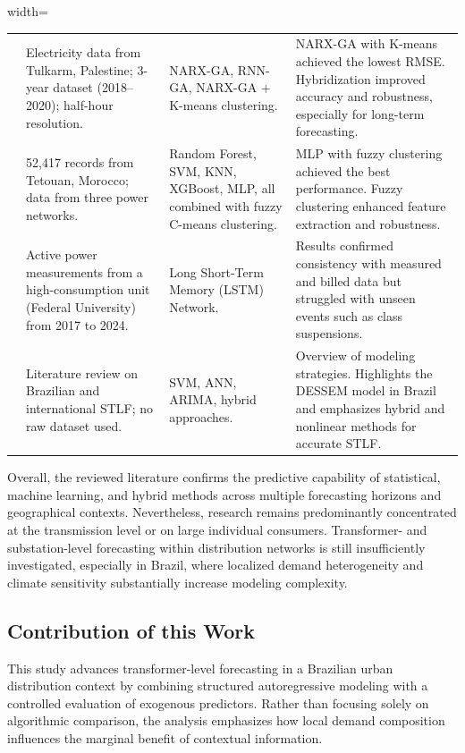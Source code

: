 \begin{table}[p]
{\begin{adjustbox}{width=\textheight}
\begin{tabular}{p{3cm} p{5cm} p{4.5cm} p{6cm}}
\cite{Hussein2024} &
Electricity data from Tulkarm, Palestine; 3-year dataset (2018--2020); half-hour resolution. &
NARX-GA, RNN-GA, NARX-GA + K-means clustering. &
NARX-GA with K-means achieved the lowest RMSE. Hybridization improved accuracy and robustness, especially for long-term forecasting. \\

\cite{Alsalem2025} &
52,417 records from Tetouan, Morocco; data from three power networks. &
Random Forest, SVM, KNN, XGBoost, MLP, all combined with fuzzy C-means clustering. &
MLP with fuzzy clustering achieved the best performance. Fuzzy clustering enhanced feature extraction and robustness. \\

\cite{DosSantos2024} &
Active power measurements from a high-consumption unit (Federal University) from 2017 to 2024. &
Long Short-Term Memory (LSTM) Network. &
Results confirmed consistency with measured and billed data but struggled with unseen events such as class suspensions. \\

\cite{Aquila2023} &
Literature review on Brazilian and international STLF; no raw dataset used. &
SVM, ANN, ARIMA, hybrid approaches. &
Overview of modeling strategies. Highlights the DESSEM model in Brazil and emphasizes hybrid and nonlinear methods for accurate STLF. \\

\bottomrule
\end{tabular}
\end{adjustbox}
}

\end{table}

Overall, the reviewed literature confirms the predictive capability of statistical, machine learning, and hybrid methods across multiple forecasting horizons and geographical contexts. Nevertheless, research remains predominantly concentrated at the transmission level or on large individual consumers. Transformer- and substation-level forecasting within distribution networks is still insufficiently investigated, especially in Brazil, where localized demand heterogeneity and climate sensitivity substantially increase modeling complexity.


\subsection{Contribution of this Work}

This study advances transformer-level forecasting in a Brazilian urban distribution context by combining structured autoregressive modeling with a controlled evaluation of exogenous predictors. Rather than focusing solely on algorithmic comparison, the analysis emphasizes how local demand composition influences the marginal benefit of contextual information.

